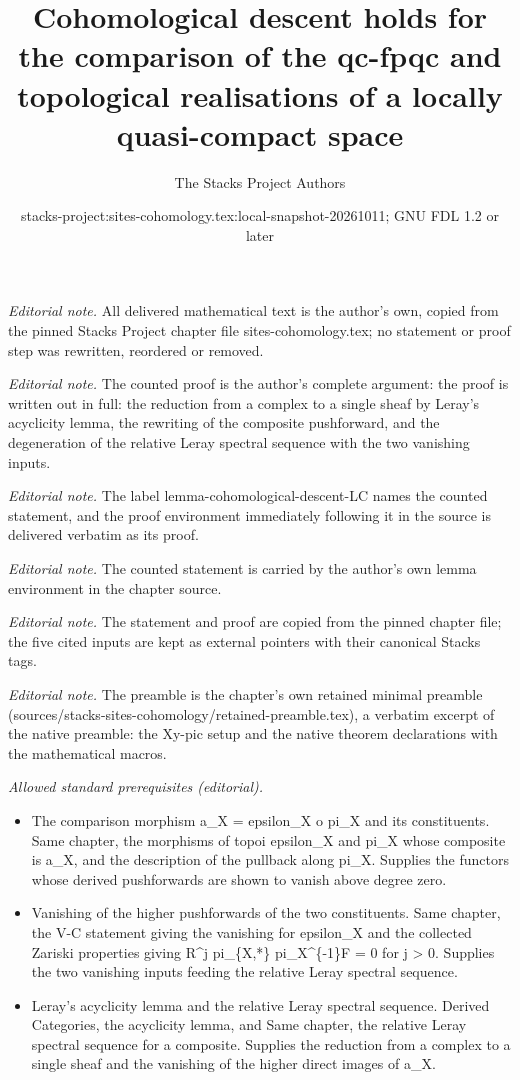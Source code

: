 \documentclass[10pt,a4paper]{amsart}
\title{Cohomological descent holds for the comparison of the qc-fpqc and topological realisations of a locally quasi-compact space}
\author{The Stacks Project Authors}
\date{stacks-project:sites-cohomology.tex:local-snapshot-20261011; GNU FDL 1.2 or later}
\theoremstyle{plain}
\theoremstyle{definition}
\theoremstyle{remark}
\numberwithin{equation}{subsection}
\begin{document}
\maketitle
\noindent\textit{Editorial note.} All delivered mathematical text is the author's own, copied from the pinned Stacks Project chapter file sites-cohomology.tex; no statement or proof step was rewritten, reordered or removed.\par\medskip
\noindent\textit{Editorial note.} The counted proof is the author's complete argument: the proof is written out in full: the reduction from a complex to a single sheaf by Leray's acyclicity lemma, the rewriting of the composite pushforward, and the degeneration of the relative Leray spectral sequence with the two vanishing inputs.\par\medskip
\noindent\textit{Editorial note.} The label lemma-cohomological-descent-LC names the counted statement, and the proof environment immediately following it in the source is delivered verbatim as its proof.\par\medskip
\noindent\textit{Editorial note.} The counted statement is carried by the author's own lemma environment in the chapter source.\par\medskip
\noindent\textit{Editorial note.} The statement and proof are copied from the pinned chapter file; the five cited inputs are kept as external pointers with their canonical Stacks tags.\par\medskip
\noindent\textit{Editorial note.} The preamble is the chapter's own retained minimal preamble (sources/stacks-sites-cohomology/retained-preamble.tex), a verbatim excerpt of the native preamble: the Xy-pic setup and the native theorem declarations with the mathematical macros.\par\medskip
\noindent\textit{Allowed standard prerequisites (editorial).}\begin{itemize}
\item The comparison morphism a\_X = epsilon\_X o pi\_X and its constituents. Same chapter, the morphisms of topoi epsilon\_X and pi\_X whose composite is a\_X, and the description of the pullback along pi\_X. Supplies the functors whose derived pushforwards are shown to vanish above degree zero.
\item Vanishing of the higher pushforwards of the two constituents. Same chapter, the V-C statement giving the vanishing for epsilon\_X and the collected Zariski properties giving R\textasciicircum{}j pi\_\{X,*\} pi\_X\textasciicircum{}\{-1\}F = 0 for j > 0. Supplies the two vanishing inputs feeding the relative Leray spectral sequence.
\item Leray's acyclicity lemma and the relative Leray spectral sequence. Derived Categories, the acyclicity lemma, and Same chapter, the relative Leray spectral sequence for a composite. Supplies the reduction from a complex to a single sheaf and the vanishing of the higher direct images of a\_X.
\end{itemize}\medskip
\end{document}

